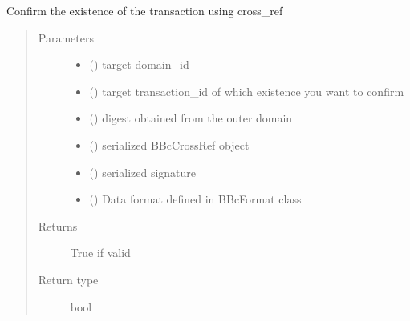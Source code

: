 \documentclass[letterpaper,10pt,english]{sphinxmanual}
\begin{document}

\begin{fulllineitems}
\label{\detokenize{bbc1.core.bbclib:bbc1.core.bbclib.verify_using_cross_ref}}
Confirm the existence of the transaction using cross\_ref
\begin{quote}\begin{description}
\item[{Parameters}] \leavevmode\begin{itemize}
\item {} 
 () \textendash{} target domain\_id

\item {} 
 () \textendash{} target transaction\_id of which existence you want to confirm

\item {} 
 () \textendash{} digest obtained from the outer domain

\item {} 
 () \textendash{} serialized BBcCrossRef object

\item {} 
 () \textendash{} serialized signature

\item {} 
 () \textendash{} Data format defined in BBcFormat class

\end{itemize}

\item[{Returns}] \leavevmode
True if valid

\item[{Return type}] \leavevmode
bool

\end{description}\end{quote}

\end{fulllineitems}
\end{document}
